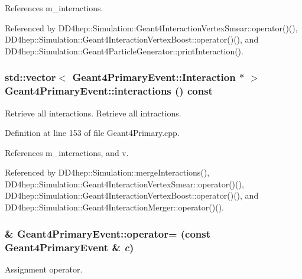 References m\_\-interactions.

Referenced by DD4hep::Simulation::Geant4InteractionVertexSmear::operator()(), DD4hep::Simulation::Geant4InteractionVertexBoost::operator()(), and DD4hep::Simulation::Geant4ParticleGenerator::printInteraction().\hypertarget{class_d_d4hep_1_1_simulation_1_1_geant4_primary_event_a332057fef57fcbec43b0c6c512e411ee}{
\subsubsection[{interactions}]{\setlength{\rightskip}{0pt plus 5cm}std::vector$<$ {\bf Geant4PrimaryEvent::Interaction} $\ast$ $>$ Geant4PrimaryEvent::interactions () const}}
\label{class_d_d4hep_1_1_simulation_1_1_geant4_primary_event_a332057fef57fcbec43b0c6c512e411ee}


Retrieve all interactions. Retrieve all intractions. 

Definition at line 153 of file Geant4Primary.cpp.

References m\_\-interactions, and v.

Referenced by DD4hep::Simulation::mergeInteractions(), DD4hep::Simulation::Geant4InteractionVertexSmear::operator()(), DD4hep::Simulation::Geant4InteractionVertexBoost::operator()(), and DD4hep::Simulation::Geant4InteractionMerger::operator()().\hypertarget{class_d_d4hep_1_1_simulation_1_1_geant4_primary_event_af01ff35982390af71d52773488027179}{
\subsubsection[{operator=}]{ \& Geant4PrimaryEvent::operator= (const {\bf Geant4PrimaryEvent} \& {\em c})}}
\label{class_d_d4hep_1_1_simulation_1_1_geant4_primary_event_af01ff35982390af71d52773488027179}


Assignment operator. 


